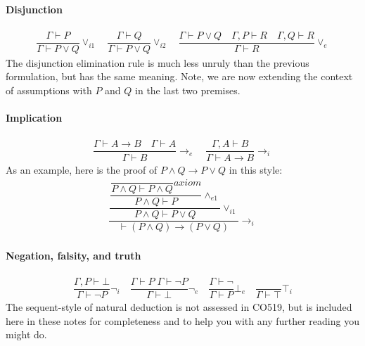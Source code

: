 \documentclass{article}
\theoremstyle{definition}
\begin{document}
\paragraph{Disjunction}

\begin{align*}
\dfrac{\Gamma \vdash P}
      {\Gamma \vdash P \vee Q}  {\vee_{i1}}
\quad
\dfrac{\Gamma \vdash Q}
      {\Gamma \vdash P \vee Q} {\vee_{i2}}
\quad
\dfrac{\Gamma \vdash P \vee Q
  \quad \Gamma, P \vdash R
  \quad \Gamma, Q \vdash R}
      {\Gamma \vdash R} {\vee_{e}}
\end{align*}
%
The disjunction elimination rule is much less unruly than the previous
formulation, but has the same meaning. Note, we are now extending the
context of assumptions with $P$ and $Q$ in the last two premises.

\paragraph{Implication}

\begin{align*}
\dfrac{\Gamma \vdash A \rightarrow B \quad \Gamma \vdash A}
      {\Gamma \vdash B} {\rightarrow_e}
\quad
\dfrac{\Gamma, A \vdash B}{\Gamma \vdash A \rightarrow B}
 {\rightarrow_i}
\end{align*}
As an example, here is the proof of $P \wedge Q \rightarrow P \vee Q$
in this style:
%
\newcommand{\pAB}{\dfrac{}{P \wedge Q \vdash P \wedge Q} {\textit{axiom}}}
\begin{align*}
  \dfrac{
  \dfrac{\dfrac{\pAB}{P \wedge Q \vdash P} {\wedge_{e1}}}
  {P \wedge Q \vdash P \vee Q} {\vee_{i1}}}
  {\vdash (P \wedge Q) \rightarrow (P \vee Q)} {\rightarrow_{i}}
\end{align*}

\paragraph{Negation,  falsity, and truth}

\begin{align*}
  \dfrac{\Gamma, P \vdash \bot}{\Gamma \vdash \neg P} {\neg_i}
  \quad
  \dfrac{\Gamma \vdash P \; \Gamma \vdash \neg P}{\Gamma \vdash \bot} {\neg_e}
  \quad
  \dfrac{\Gamma \vdash \neg}{\Gamma \vdash P} {\bot_e}
  \quad
  \dfrac{}{\Gamma \vdash \top} {\top_i}
\end{align*}
%
The sequent-style of natural deduction is not assessed in CO519, but
is included here in these notes for completeness and to help you with
any further reading you might do.
  
\end{document}

